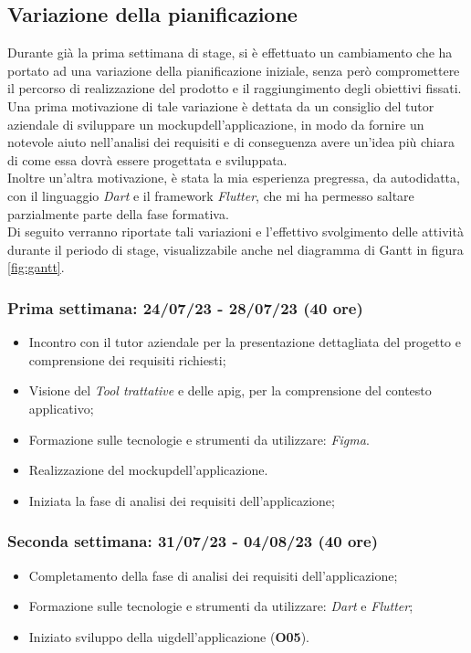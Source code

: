 \subsection{Variazione della pianificazione}
\label{subsec:variazione-pianificazione}

Durante già la prima settimana di stage, si è  effettuato un cambiamento che ha portato ad una variazione della pianificazione iniziale, senza però compromettere il percorso di realizzazione del prodotto e il raggiungimento degli obiettivi fissati.\\
Una prima motivazione di tale variazione è dettata da un consiglio del tutor aziendale di sviluppare un \gls{mockup}\glsoccur dell'applicazione, in modo da fornire un notevole aiuto nell'analisi dei requisiti e di conseguenza avere un'idea più chiara di come essa dovrà essere progettata e sviluppata.\\
Inoltre un'altra motivazione, è stata la mia esperienza pregressa, da autodidatta, con il linguaggio \emph{Dart}\cite{site:dart} e il framework \emph{Flutter}\cite{site:flutter}, che mi ha permesso saltare parzialmente parte della fase formativa.\\
Di seguito verranno riportate tali variazioni e l'effettivo svolgimento delle attività durante il periodo di stage, visualizzabile anche nel diagramma di Gantt in figura \ref{fig:gantt}.

\subsubsection{Prima settimana: 24/07/23 - 28/07/23 (40 ore)}
    \begin{itemize}
        \item Incontro con il tutor aziendale per la presentazione dettagliata del progetto e comprensione dei requisiti richiesti;
        \item Visione del \emph{Tool trattative} e delle \gls{apig}\glsoccur, per la comprensione del contesto applicativo;
        \item Formazione sulle tecnologie e strumenti da utilizzare: \emph{Figma}\cite{site:figma}.
        \item Realizzazione del \gls{mockup}\glsoccur dell'applicazione.
        \item Iniziata la fase di analisi dei requisiti dell'applicazione;
    \end{itemize}
\subsubsection{Seconda settimana: 31/07/23 - 04/08/23 (40 ore)}
    \begin{itemize}
        \item Completamento della fase di analisi dei requisiti dell'applicazione;
        \item Formazione sulle tecnologie e strumenti da utilizzare: \emph{Dart}\cite{site:dart} e \emph{Flutter}\cite{site:flutter};
        \item Iniziato sviluppo  della \gls{uig}\glsoccur dell'applicazione (\textbf{O05}).
    \end{itemize}
